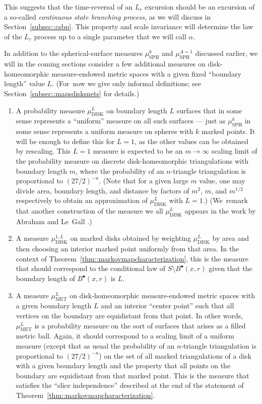 \documentclass[10pt]{amsart}
\newcommand{\sbullet}{{\scriptscriptstyle\bullet}}
\theoremstyle{plain}
\numberwithin{theorem}{section}
\theoremstyle{definition}
\newcommand{\musk}{\mu_{\mathrm{SPH}}^k}
\newcommand{\musa}{{\mu_{\mathrm{SPH}}^{A=1}}}
\newcommand{\mudonel}{\mu_{ \mathrm{DISK}}^{1, L}}
\newcommand{\mudl}{\mu_{\mathrm{DISK}}^L}
\newcommand{\muml}{\mu_{\mathrm{MET}}^L}
\newcommand{\fb}[2]{B^\sbullet(#1,#2)}
\begin{document}
This suggests that the time-reversal of an $L_r$ excursion should be an excursion of a so-called \emph{continuous state branching process}, as we will discuss in Section~\ref{subsec::csbp}. This property and scale invariance will determine the law of the $L_r$ process up to a single parameter that we will call $\alpha$.

\vfill
\pagebreak[2]
In addition to the spherical-surface measures $\musk$ and $\musa$ discussed earlier, we will in the coming sections consider a few additional measures on disk-homeomorphic measure-endowed metric spaces with a given fixed ``boundary length'' value $L$. (For~now we give only informal definitions; see Section~\ref{subsec::mapsdisksnets} for details.)\enlargethispage{.5\baselineskip}%
\begin{enumerate}
\item A probability measure $\mudl$ on boundary length $L$ surfaces that in some sense represents a ``uniform'' measure on all such surfaces --- just as $\musk$ in some sense represents a uniform measure on spheres with $k$ marked points. It will be enough to define this for $L=1$, as the other values can be obtained by rescaling.
This $L=1$ measure is expected to be an $m \to \infty$ scaling limit of the probability measure on discrete disk-homeomorphic triangulations with boundary length $m$, where the probability of an $n$-triangle triangulation is proportional to $(27/2)^{-n}$. (Note that for a given large $m$ value, one may divide area, boundary length, and distance by factors of $m^2$, $m$, and $m^{1/2}$ respectively to obtain an approximation of $\mudl$ with $L=1$.) (We~remark that another construction of the measure we all $\mudl$ appears in the work by Abraham and Le~Gall \cite{alg}.)
\item A measure $\mudonel$ on marked disks obtained by weighting $\mudl$ by area and then choosing an interior marked point uniformly from that area. In the context of Theorem~\ref{thm::markovmapcharacterization}, this is the measure that should correspond to the conditional law of $S\setminus \fb{x}{r}$ given that the boundary length of $\fb{x}{r}$ is $L$.
\item A measure $\muml$ on disk-homeomorphic measure-endowed metric spaces with a given boundary length $L$ and an interior ``center point'' such that all vertices on the boundary are equidistant from that point. In other words, $\muml$ is a probability measure on the sort of surfaces that arises as a filled metric ball. Again, it should correspond to a scaling limit of a uniform measure (except that as usual the probability of an $n$-triangle triangulation is proportional to $(27/2)^{-n}$) on the set of all marked triangulations of a disk with a given boundary length and the property that all points on the boundary are equidistant from that marked point. This is the measure that satisfies the ``slice independence'' described at the end of the statement of Theorem~\ref{thm::markovmapcharacterization}.
\end{enumerate}
\end{document}
